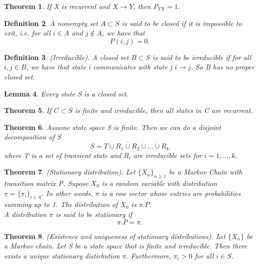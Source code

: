\documentclass[twoside]{article}
\newcounter{lecnum}
\newtheorem{theorem}{Theorem}[lecnum]
\newtheorem{lemma}[theorem]{Lemma}
\newtheorem{definition}[theorem]{Definition}
\begin{document}
\begin{theorem}If X is recurrent and $X \rightarrow Y$, then $P_{YX} = 1$.
\end{theorem}

\begin{definition}A nonempty set $A \subset S$ is said to be closed if it is impossible to exit, i.e. for all $i \in A$ and $j \not \in A$, we have that 
$$
P(i,j) = 0.
$$
\end{definition}

\begin{definition}(Irreducible). A closed set $B \subset S$ is said to be irreducible if for all $i,j \in B$, we have that state i communicates with state j $i \rightarrow j$. So B has no proper closed set.
\end{definition}

\begin{lemma}Every state S is a closed set.
\end{lemma}

\begin{theorem}If $C \subset S$ is finite and irreducible, then all states in C are recurrent.
\end{theorem}

\begin{theorem}Assume state space S is finite. Then we can do a disjoint decomposition of S 
$$
S = T \dot \cup R_1 \dot \cup R_2 \dot \cup ... \dot \cup R_k
$$
where T is a set of transient state and $R_i$ are irreducible sets for $i = 1,...,k$.
\end{theorem}


\begin{theorem}(Stationary distribution). Let $\{X_n\}_{n \geq 1}$ be a Markov Chain with transition matrix P. Supose $X_0$ is a random variable with distribution $\pi = \{\pi_i\}_{i \in S}$. In other words, $\pi$ is a row vector whose entries are probabilities summing up to 1. The distribution of $X_0$ is $\pi.P$.\\ A distribution $\pi$ is said to be stationary if $$\pi.P = \pi.$$
\end{theorem}

\begin{theorem}(Existence and uniqueness of stationary distributions). Let $\{X_n\}$ be a Markov chain. Let S be a state space that is finite and irreducible. Then there exists a unique stationary distirbution $\pi$. Furthermore, $\pi_i > 0$ for all $i \in S$.
\end{theorem}
\end{document}
